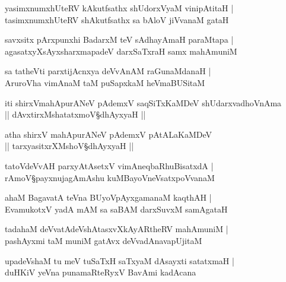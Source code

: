 \begin{shloka}
yasimxnumxhUteRV kAkutfsathx shUdorxVyaM vinipAtitaH |\\
tasimxnumxhUteRV shAkutfsathx sa bAloV jiVvanaM gataH 
\end{shloka}

\begin{shloka}
savxsitx pArxpunxhi BadarxM teV sAdhayAmaH paraMtapa |\\
agasatxyXsAyxsharxmapadeV darxSaTxraH samx mahAmuniM
\end{shloka}

\begin{shloka}
sa tatheVti parxtijAcnxya deVvAnAM raGunaMdanaH |\\
AruroVha vimAnaM taM puSapxkaM heVmaBUSitaM 
\end{shloka}
\begin{center}
{\large iti shirxVmahApurANeV pAdemxV saqSiTxKaMDeV shUdarxvadhoVnAma}\\
{\large || dAvxtirxMshatatxmoV\S dhAyxyaH ||}
\end{center}

\setcounter{shloka}{0}

\begin{center}
{\large atha shirxV mahApurANeV pAdemxV pAtALaKaMDeV}\\
{\large || tarxyasitxrXMshoV\S dhAyxyaH ||}
\end{center}

\begin{shloka}
tatoVdeVvAH parxyAtAsetxV vimAneqbaRhuBisatxdA |\\
rAmoV\S payxnujagAmAshu kuMBayoVneVsatxpoVvanaM 
\end{shloka}

\begin{shloka}
ahaM BagavatA teVna BUyoVpAyxgamanaM kaqthAH |\\
EvamukotxV yadA mAM sa saBAM darxSuvxM samAgataH
\end{shloka}

\begin{shloka}
tadahaM deVvatAdeVshAtasxvXkAyARtheRV mahAmuniM |\\
pashAyxmi taM muniM gatAvx deVvadAnavapUjitaM 
\end{shloka}

\begin{shloka}
upadeVshaM tu meV tuSaTxH saTxyaM dAsayxti satatxmaH |\\
duHKiV yeVna punamaRteRyxV BavAmi kadAcana
\end{shloka}

